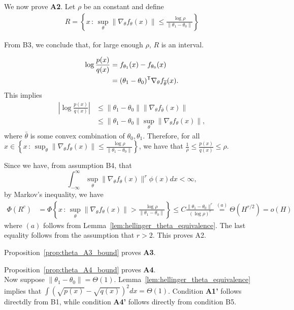 \documentclass{article}
\begin{document}
We now prove \textbf{A2}. Let $\rho$ be an constant and define 
\begin{align}
R = \left\{ x \,:\, \sup_\theta \| \nabla_\theta f_\theta(x) \| 
      \leq \frac{\log \rho}{\| \theta_1 - \theta_0 \|} \right\}  \label{eqn:parametric_R_defn}
\end{align}

From B3, we conclude that, for large enough $\rho$, $R$ is an interval. 

\begin{align*}
\log \frac{p(x)}{q(x)} &= f_{\theta_1}(x) - f_{\theta_0}(x)\\
           &= (\theta_1 - \theta_0)^{\mathsf{T}} \nabla_{\theta} f_{\overline{\theta}} (x).
\end{align*}
This implies 
\begin{align*}
\left | \log \frac{p(x)}{q(x)} \right | &\leq \| \theta_1 - \theta_0 \| \| \nabla_{\theta} f_{\bar{\theta}} (x) \| \\
                &\leq  \| \theta_1 - \theta_0 \| \sup_\theta \| \nabla_{\theta} f_{\theta} (x) \|,
\end{align*}
where $\bar{\theta}$ is some convex combination of $\theta_0, \theta_1$. Therefore, for all $ x \in
  \left\{ x \,:\, \sup_\theta \| \nabla_{\theta} f_{\theta} (x) \| \leq \frac{\log \rho}{\| \theta_1 - \theta_0 \|} \right\}$, we have that $\frac{1}{\rho} \leq \frac{p(x)}{q(x)} \leq \rho$.

Since we have, from assumption B4, that
\[
 \int_{-\infty}^{\infty} \sup_\theta \| \nabla_{\theta} f_{\theta}(x) \|^{r} \phi(x) dx < \infty,
\]
by Markov's inequality, we have
\begin{align*}
\Phi(R^c) &= \Phi \left\{ x \,:\, \sup_\theta \| \nabla_{\theta} f_{\theta}(x) \|  
    > \frac{\log \rho}{\| \theta_1 - \theta_0 \|} \right\} 
    \leq C \frac{\| \theta_1 - \theta_0 \|^{r}}{(\log \rho)^{r}} 
    \stackrel{(a)}= \Theta( H^{r/2} ) = o(H)
\end{align*}
where $(a)$ follows from Lemma~\ref{lem:hellinger_theta_equivalence}. The last equality follows from the assumption that $r > 2$. This proves A2.

Proposition~\ref{prop:theta_A3_bound} proves \textbf{A3}. 

Proposition~\ref{prop:theta_A4_bound} proves \textbf{A4}.\\

Now suppose $\| \theta_1 - \theta_0 \| = \Theta(1)$. Lemma~\ref{lem:hellinger_theta_equivalence} implies that $\int (\sqrt{p(x)} - \sqrt{q(x)})^2 dx = \Theta(1)$. Condition \textbf{A1'} follows directdly from B1, while condition \textbf{A4'} follows directly from condition B5. 
\end{document}
